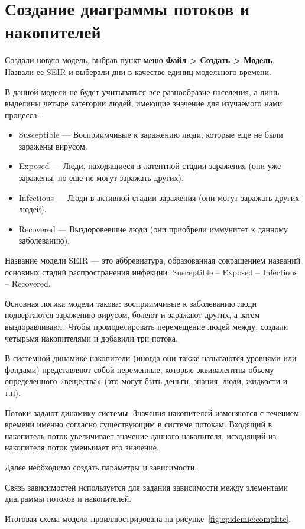 \section{Создание диаграммы потоков и накопителей}
Создали новую модель, выбрав пункт меню \textbf{Файл > Создать > Модель}.
Назвали ее SEIR и выберали дни в качестве единиц модельного времени.\par
В данной модели не будет учитываться все разнообразие населения, а лишь
выделины четыре категории людей, имеющие значение для изучаемого нами
процесса:

\begin{itemize}
	\item Susceptible --- Восприимчивые к заражению люди, которые еще не были
		заражены вирусом.
	\item Exposed --- Люди, находящиеся в латентной стадии заражения (они уже
		заражены, но еще не могут заражать других).
	\item Infectious --- Люди в активной стадии заражения (они могут заражать
		других людей).
	\item Recovered --- Выздоровевшие люди (они приобрели иммунитет к
		данному заболеванию).
\end{itemize}

Название модели SEIR --- это аббревиатура, образованная сокращением названий
основных стадий распространения инфекции:
Susceptible -- Exposed -- Infectious -- Recovered.\par
Основная логика модели такова: восприимчивые к заболеванию люди
подвергаются заражению вирусом, болеют и заражают других, а затем
выздоравливают. Чтобы промоделировать перемещение людей между, создали
четырьмя накопителями и добавили три потока.\par
В системной динамике накопители (иногда они также называются уровнями или
фондами) представляют собой переменные, которые эквивалентны объему
определенного «вещества» (это могут быть деньги, знания, люди, жидкости и
т.п).\par
Потоки задают динамику системы. Значения накопителей изменяются с
течением времени именно согласно существующим в системе потокам.
Входящий в накопитель поток увеличивает значение данного накопителя,
исходящий из накопителя поток уменьшает его значение.\par
Далее необходимо создать параметры и зависимости.\par
Связь зависимостей используется для задания зависимости между элементами
диаграммы потоков и накопителей.\par
Итоговая схема модели проиллюстрирована на рисунке~\ref{fig:epidemic:complite}.

